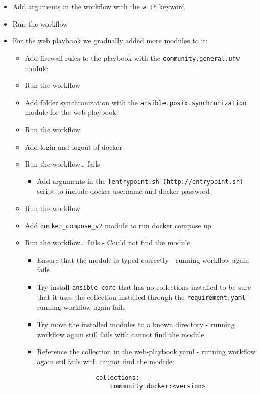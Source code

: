 \begin{itemize}
    \item Add arguments in the workflow with the \texttt{with} keyword
    \item Run the workflow
    \item For the web playbook we gradually added more modules to it:

    \begin{itemize}
        \item Add firewall rules to the playbook with the \texttt{community.general.ufw} module
        \item Run the workflow
        \item Add folder synchronization with the \texttt{ansible.posix.synchronization} module for the web-playbook
        \item Run the workflow
        \item Add login and logout of docker
        \item Run the workflow\ldots{} fails

        \begin{itemize}
            \item Add arguments in the \texttt{{[}entrypoint.sh{]}(http://entrypoint.sh)} script to include docker username and docker password
        \end{itemize}

        \item Run the workflow
        \item Add \texttt{docker\_compose\_v2} module to run docker compose up
        \item Run the workflow\ldots{} fails - Could not find the module

        \begin{itemize}
            \item Ensure that the module is typed correctly - running workflow again fails
            \item Try install \texttt{ansible-core} that has no collections installed to be sure that it uses the collection installed through the \texttt{requirement.yaml} - running workflow again fails
            \item Try move the installed modules to a known directory - running workflow again still fails with cannot find the module
            \item Reference the collection in the web-playbook.yaml - running workflow again stil fails with cannot find the module:

            \begin{verbatim}
                collections:
	                community.docker:<version>
            \end{verbatim}


\end{itemize}
\end{itemize}
\end{itemize}
